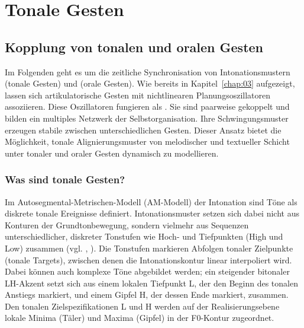 \chapter{Tonale Gesten}
\label{chap:07}

\section{Kopplung von tonalen und oralen Gesten}
\label{sec:0701}

Im Folgenden geht es um die zeitliche Synchronisation von Intonationsmustern (tonale Gesten) und  (orale Gesten). Wie bereits in Kapitel~\ref{chap:03} aufgezeigt, lassen sich artikulatorische Gesten mit nichtlinearen Planungsoszillatoren assoziieren. Diese Oszillatoren fungieren als . Sie sind paarweise gekoppelt und bilden ein multiples Netzwerk der Selbstorganisation. Ihre Schwingungsmuster erzeugen stabile  zwischen unterschiedlichen Gesten. Dieser Ansatz bietet die Möglichkeit, tonale Alignierungsmuster von melodischer und textueller Schicht unter  tonaler und oraler Gesten dynamisch zu modellieren. 

\subsection{Was sind tonale Gesten?}
\label{subsec:070101}

Im Autosegmental-Metrischen-Modell (AM-Modell) der Intonation sind Töne als diskrete tonale Ereignisse definiert. Intonationsmuster setzen sich dabei nicht aus Konturen der Grundtonbewegung, sondern vielmehr aus Sequenzen unterschiedlicher, diskreter Tonstufen wie Hoch- und Tiefpunkten (High und Low) zusammen (vgl. \citealt{Grice2002}, \citealt{Ladd2008}). Die Tonstufen markieren Abfolgen tonaler Zielpunkte (tonale Targets), zwischen denen die Intonationskontur linear interpoliert wird. Dabei können auch komplexe Töne abgebildet werden; ein steigender bitonaler LH-Akzent setzt sich aus einem lokalen Tiefpunkt L, der den Beginn des tonalen Anstiegs markiert, und einem Gipfel H, der dessen Ende markiert, zusammen. Den tonalen Zielspezifikationen L und H werden auf der Realisierungsebene lokale Minima (Täler) und Maxima (Gipfel) in der F0-Kontur zugeordnet.

